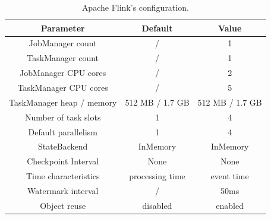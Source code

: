\begin{table}[htbp]
    \centering
    \begin{tabular}{|c|c|c|}
        \hline
        \textbf{Parameter}        & \textbf{Default} & \textbf{Value}  \\ \hline
        JobManager count          & /                & 1               \\ \hline
        TaskManager count         & /                & 1               \\ \hline
        JobManager CPU cores      & /                & 2               \\ \hline
        TaskManager CPU cores     & /                & 5               \\ \hline
        TaskManager heap / memory & 512 MB / 1.7 GB  & 512 MB / 1.7 GB \\ \hline
        Number of task slots      & 1                & 4               \\ \hline
        Default parallelism       & 1                & 4               \\ \hline
        StateBackend              & InMemory         & InMemory        \\ \hline
        Checkpoint Interval       & None             & None            \\ \hline
        Time characteristics      & processing time  & event time      \\ \hline
        Watermark interval        & /                & 50ms            \\ \hline
        Object reuse              & disabled         & enabled         \\ \hline
    \end{tabular}
    \caption{Apache Flink's configuration.}
\label{tab:computer_specs}
\end{table}

